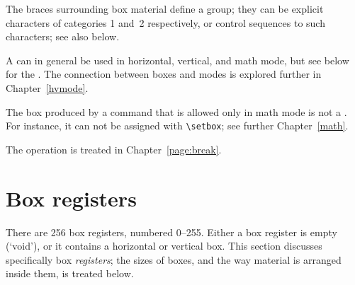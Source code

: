 \documentclass{book}
\begin{document}
The braces surrounding box material define a group;
they can be explicit characters
of categories 1 and~2 respectively,
or control sequences  to such characters;
see also below.


A  can in general be used in horizontal, vertical,
and math mode, but see below for the .
The connection between
boxes and modes is explored further in Chapter~\ref{hvmode}.

The box produced by  \ldash a command that is allowed only in
math mode \rdash  is not a . For instance,
it can not be assigned with \verb=\setbox=; see further
Chapter~\ref{math}.

The  operation is treated in Chapter~\ref{page:break}.

\section{Box registers}

There are 256 box registers, numbered 0--255.
Either a box register is  empty (`void'), or it contains a horizontal
or vertical box.
This section discusses specifically box {\em registers};
the sizes of boxes, and the way material is arranged inside them,
is treated below.

\end{document}
